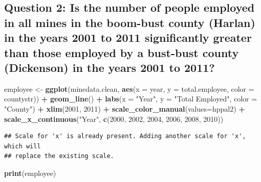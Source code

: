\documentclass[12pt,]{article}
\newenvironment{Shaded}{\begin{snugshade}}{\end{snugshade}}
\newcommand{\DataTypeTok}[1]{\textcolor[rgb]{0.13,0.29,0.53}{#1}}
\newcommand{\DecValTok}[1]{\textcolor[rgb]{0.00,0.00,0.81}{#1}}
\newcommand{\KeywordTok}[1]{\textcolor[rgb]{0.13,0.29,0.53}{\textbf{#1}}}
\newcommand{\NormalTok}[1]{#1}
\newcommand{\OperatorTok}[1]{\textcolor[rgb]{0.81,0.36,0.00}{\textbf{#1}}}
\newcommand{\StringTok}[1]{\textcolor[rgb]{0.31,0.60,0.02}{#1}}
\begin{document}
\hypertarget{question-2-is-the-number-of-people-employed-in-all-mines-in-the-boom-bust-county-harlan-in-the-years-2001-to-2011-significantly-greater-than-those-employed-by-a-bust-bust-county-dickenson-in-the-years-2001-to-2011}{%
\subsection{Question 2: Is the number of people employed in all mines in
the boom-bust county (Harlan) in the years 2001 to 2011 significantly
greater than those employed by a bust-bust county (Dickenson) in the
years 2001 to
2011?}\label{question-2-is-the-number-of-people-employed-in-all-mines-in-the-boom-bust-county-harlan-in-the-years-2001-to-2011-significantly-greater-than-those-employed-by-a-bust-bust-county-dickenson-in-the-years-2001-to-2011}}

\begin{Shaded}
\begin{Highlighting}[]
\NormalTok{employee <-}\StringTok{ }\KeywordTok{ggplot}\NormalTok{(minedata.clean, }\KeywordTok{aes}\NormalTok{(}\DataTypeTok{x =}\NormalTok{ year, }\DataTypeTok{y =}\NormalTok{ total.employee, }\DataTypeTok{color =}\NormalTok{ countystr)) }\OperatorTok{+}
\StringTok{  }\KeywordTok{geom_line}\NormalTok{() }\OperatorTok{+}
\StringTok{  }\KeywordTok{labs}\NormalTok{(}\DataTypeTok{x =} \StringTok{"Year"}\NormalTok{, }\DataTypeTok{y =} \StringTok{"Total Employed"}\NormalTok{, }\DataTypeTok{color =} \StringTok{"County"}\NormalTok{) }\OperatorTok{+}
\StringTok{  }\KeywordTok{xlim}\NormalTok{(}\DecValTok{2001}\NormalTok{, }\DecValTok{2011}\NormalTok{) }\OperatorTok{+}
\StringTok{  }\KeywordTok{scale_color_manual}\NormalTok{(}\DataTypeTok{values=}\NormalTok{hppal2) }\OperatorTok{+}
\StringTok{  }\KeywordTok{scale_x_continuous}\NormalTok{(}\StringTok{"Year"}\NormalTok{, }\KeywordTok{c}\NormalTok{(}\DecValTok{2000}\NormalTok{, }\DecValTok{2002}\NormalTok{, }\DecValTok{2004}\NormalTok{, }\DecValTok{2006}\NormalTok{, }\DecValTok{2008}\NormalTok{, }\DecValTok{2010}\NormalTok{))}
\end{Highlighting}
\end{Shaded}

\begin{verbatim}
## Scale for 'x' is already present. Adding another scale for 'x', which will
## replace the existing scale.
\end{verbatim}

\begin{Shaded}
\begin{Highlighting}[]
\KeywordTok{print}\NormalTok{(employee)}
\end{Highlighting}
\end{Shaded}
\end{document}
